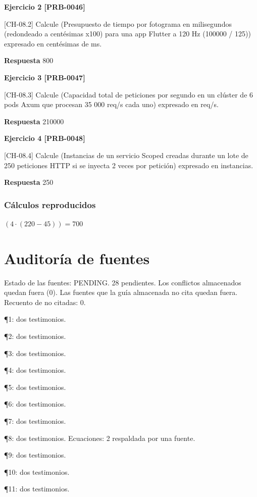 \documentclass{book}
\begin{document}
\noindent\textbf{Ejercicio 2 [PRB-0046]}

[CH-08.2] Calcule (Presupuesto de tiempo por fotograma en milisegundos (redondeado a centésimas x100) para una app Flutter a 120 Hz (100000 / 125)) expresado en centésimas de ms.

\noindent\textbf{Respuesta} 800

\noindent\textbf{Ejercicio 3 [PRB-0047]}

[CH-08.3] Calcule (Capacidad total de peticiones por segundo en un clúster de 6 pods Axum que procesan 35 000 req/s cada uno) expresado en req/s.

\noindent\textbf{Respuesta} 210000

\noindent\textbf{Ejercicio 4 [PRB-0048]}

[CH-08.4] Calcule (Instancias de un servicio Scoped creadas durante un lote de 250 peticiones HTTP si se inyecta 2 veces por petición) expresado en instancias.

\noindent\textbf{Respuesta} 250

\subsection*{Cálculos reproducidos}

\(\left(4\cdot \left(220-45\right)\right) = 700\)
\chapter{Auditoría de fuentes}

\noindent Estado de las fuentes: PENDING. 28 pendientes. Los conflictos almacenados quedan fuera (0). Las fuentes que la guía almacenada no cita quedan fuera. Recuento de no citadas: 0.

\noindent ¶1: dos testimonios.

\noindent ¶2: dos testimonios.

\noindent ¶3: dos testimonios.

\noindent ¶4: dos testimonios.

\noindent ¶5: dos testimonios.

\noindent ¶6: dos testimonios.

\noindent ¶7: dos testimonios.

\noindent ¶8: dos testimonios. Ecuaciones: 2 respaldada por una fuente.

\noindent ¶9: dos testimonios.

\noindent ¶10: dos testimonios.

\noindent ¶11: dos testimonios.
\end{document}
